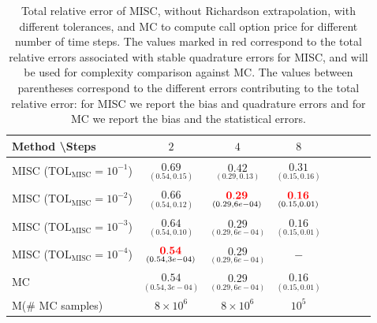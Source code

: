 \begin{table}[h!]
	\centering
	\begin{tabular}{l*{6}{c}r}
		Method \textbackslash  Steps            & $2$ & $4$ & $8$   \\
		\hline

		MISC ($\text{TOL}_{\text{MISC}}=10^{-1}$)  & $\underset{(0.54,0.15)}{\mathbf{
			0.69}}$& $ \underset{(0.29,0.13)}{\mathbf{    
			0.42}}$ & $ \underset{(0.15,0.16)}{\mathbf{     
			0.31
		}}$   \\

		MISC ($\text{TOL}_{\text{MISC}}=10^{-2}$)  & $\underset{(0.54,0.12)}{\mathbf{ 
			0.66}}$ & $ \underset{(0.29,6e-04)}{\mathbf{  {\color{red} 
				0.29
			}
		}}$ & $\underset{(0.15,0.01)}{\mathbf{ {\color{red}    0.16}}}$   \\
		MISC ($\text{TOL}_{\text{MISC}}=10^{-3}$)        & $\underset{(0.54,0.10)}{\mathbf{
			0.64}}$  &  $ \underset{(0.29,6e-04)}{\mathbf{
			0.29
		}}$ &  $\underset{(0.15,0.01)}{\mathbf{    0.16}}$ \\
		MISC ($\text{TOL}_{\text{MISC}}=10^{-4}$)        & $\underset{(0.54,3e-04)}{\mathbf{       {\color{red}0.54}}}$  & $ \underset{(0.29,6e-04)}{\mathbf{
			0.29
		}}$  &  $-$ \\
		\hline
		MC    & $\underset{(0.54,3e-04)}{\mathbf{0.54}}$  & $\underset{(0.29,6e-04)}{\mathbf{0.29}}$  &$\underset{(0.15,0.01)}{
				\mathbf{0.16}}$  \\	
		M(\# MC samples)   & $8 \times 10^6$  & $8 \times 10^6$  &$10^5$  \\	
		\hline
	\end{tabular}
	\caption{Total relative error of MISC, without Richardson extrapolation, with different tolerances, and MC to compute call option price for different number of time steps. The values marked in red correspond to the total relative errors associated with  stable quadrature errors for MISC, and will be used for complexity comparison against MC. The values between parentheses correspond to the different errors contributing to the total relative error: for MISC we report the bias and quadrature errors and for MC we report the bias and the statistical errors.}
	\label{Total error of MISC and MC to compute Call option price of the different tolerances for different number of time steps. Case $K=1$, $H=0.07$, without Richardson extrapolation. The numbers between parentheses are the corresponding absolute errors,linear}
\end{table}
\FloatBarrier




